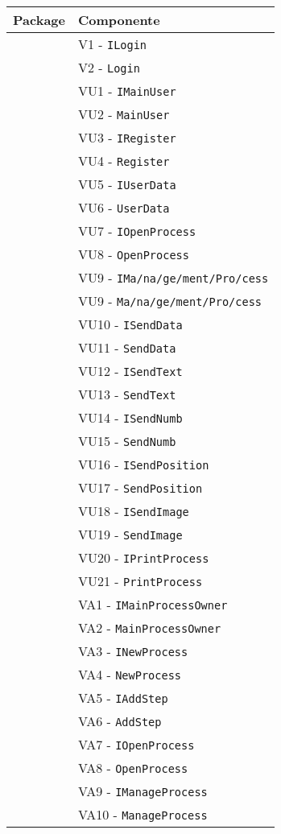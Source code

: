 \begin{longtable}{XX}
\toprule
\textbf{Package} & \textbf{Componente}\\
\midrule
\view{}&V1 - \texttt{ILogin}\\
&V2 - \texttt{Login}\\
\midrule
\viewUser{}&VU1 - \texttt{IMainUser}\\
&VU2 - \texttt{MainUser}\\
&VU3 - \texttt{IRegister}\\
&VU4 - \texttt{Register}\\
&VU5 - \texttt{IUserData}\\
&VU6 - \texttt{UserData}\\
&VU7 - \texttt{IOpenProcess}\\
&VU8 - \texttt{OpenProcess}\\
&VU9 - \texttt{IMa\fshyp{}na\fshyp{}ge\fshyp{}ment\fshyp{}Pro\fshyp{}cess}\\
&VU9 - \texttt{Ma\fshyp{}na\fshyp{}ge\fshyp{}ment\fshyp{}Pro\fshyp{}cess}\\
&VU10 - \texttt{ISendData}\\
&VU11 - \texttt{SendData}\\
&VU12 - \texttt{ISendText}\\
&VU13 - \texttt{SendText}\\
&VU14 - \texttt{ISendNumb}\\
&VU15 - \texttt{SendNumb}\\
&VU16 - \texttt{ISendPosition}\\
&VU17 - \texttt{SendPosition}\\
&VU18 - \texttt{ISendImage}\\
&VU19 - \texttt{SendImage}\\
&VU20 - \texttt{IPrintProcess}\\
&VU21 - \texttt{PrintProcess}\\
\midrule
\viewAdmin{}&VA1 - \texttt{IMainProcessOwner}\\
&VA2 - \texttt{MainProcessOwner}\\
&VA3 - \texttt{INewProcess}\\
&VA4 - \texttt{NewProcess}\\
&VA5 - \texttt{IAddStep}\\
&VA6 - \texttt{AddStep}\\
&VA7 - \texttt{IOpenProcess}\\
&VA8 - \texttt{OpenProcess}\\
&VA9 - \texttt{IManageProcess}\\
&VA10 - \texttt{ManageProcess}\\

\end{longtable}
